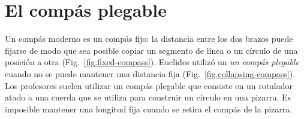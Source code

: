 
\chapter{El compás plegable}\label{c.collapse}


Un compás moderno es un compás fijo: la distancia entre los dos brazos puede fijarse de modo que sea posible copiar un segmento de línea o un círculo de una posición a otra (Fig.~\ref{fig.fixed-compass}). Euclides utilizó un \emph{un compás plegable} cuando no se puede mantener una distancia fija (Fig.~\ref{fig.collapsing-compass}). Los profesores suelen utilizar un compás plegable que consiste en un rotulador atado a una cuerda que se utiliza para construir un círculo en una pizarra. Es imposible mantener una longitud fija cuando se retira el compás de la pizarra. 

